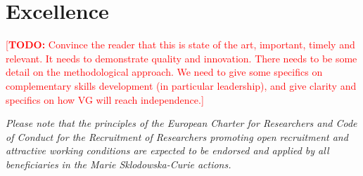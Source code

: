 \documentclass[a4paper,11pt]{article}
\newcommand{\TODO}[1]{{\textcolor{red}{[\textbf{TODO:} #1]}}}
\begin{document}
%
%
%

\newpage

\section{Excellence}
\label{sec:excellence}

\TODO{Convince the reader that this is state of the art, important, timely and relevant.  It needs to demonstrate quality and innovation.  There needs to be some detail on the methodological approach.  We need to give some specifics on complementary skills development (in particular leadership), and give clarity and specifics on how VG will reach independence.}

{\em
Please note that the principles of the European Charter for Researchers and Code of Conduct for the Recruitment of Researchers promoting open recruitment and attractive working conditions are expected to be endorsed and applied by all beneficiaries in the Marie Sklodowska-Curie actions.
}

\end{document}
